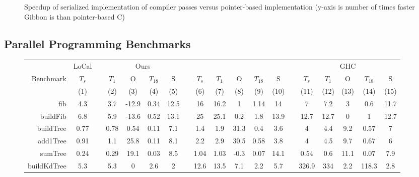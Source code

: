 \begin{figure}
  
  \caption{Speedup of serialized implementation of compiler passes versus
  pointer-based implementation (y-axis is number of times faster Gibbon is than
  pointer-based C)}\label{fig:coursecompilerbench}
\end{figure}

\subsection{Parallel Programming Benchmarks}\label{subsec:parallelbench}

\begin{figure}
  \footnotesize
  \centering
  \setlength{\tabcolsep}{0.4em}
  \begin{tabular}{@{}r cc cccc r ccccc r ccccc@{}}
    \toprule
    & LoCal & \phantom{} & \multicolumn{4}{c}{Ours} & \phantom{} & \multicolumn{5}{c}{\MPL{}} & \phantom{} & \multicolumn{5}{c}{GHC} \\
    \cmidrule{2-2}
    \cmidrule{4-7}
    \cmidrule{9-13}
    \cmidrule{15-19}
    Benchmark & $T_s$ && $T_1$ & O & $T_{18}$ & S && $T_s$ & $T_1$ & O & $T_{18}$ & S && $T_s$ & $T_1$ & O & $T_{18}$ & S \\
    & (1) && (2) & (3) & (4) & (5) && (6) & (7) & (8) & (9) & (10) && (11) & (12) & (13) & (14) & (15) \\
    \midrule

    fib & 4.3 && 3.7 & -12.9 & 0.34 & 12.5 && 16 & 16.2 & 1 & 1.14 & 14 && 7 & 7.2 & 3 & 0.6 & 11.7 \\

    buildFib  & 6.8 && 5.9 & -13.6 & 0.52 & 13.1 && 25 & 25.1 & 0.2 & 1.8 & 13.9 && 12.7 & 12.7 & 0 & 1 & 12.7 \\

    buildTree & 0.77 && 0.78 & 0.54 & 0.11 & 7.1 && 1.4 & 1.9 & 31.3 & 0.4 & 3.6 && 4 & 4.4 & 9.2 & 0.57 & 7 \\

    add1Tree & 0.91 && 1.1 & 25.8 & 0.11 & 8.1 && 2.2 & 2.9 & 30.5 & 0.58 & 3.8 && 4 & 4.5 & 9.7 & 0.67 & 6 \\

    sumTree & 0.24 && 0.29 & 19.1 & 0.03 & 8.5 && 1.04 & 1.03 & -0.3 & 0.07 & 14.1 && 0.54 & 0.6 & 11.1 & 0.07 & 7.9 \\

    buildKdTree & 5.3 && 5.3 & 0 & 2.6 & 2 && 12.6 & 13.5 & 7.1 & 2.2 & 5.7 && 326.9 & 334 & 2.2 & 118.3 & 2.8 \\


\end{tabular}
\end{figure}
